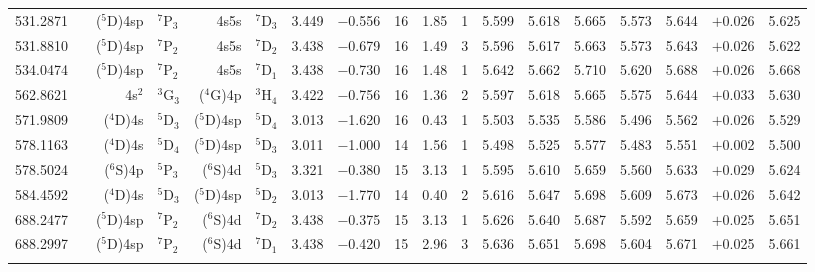 \documentclass[traditabstract]{aa}
\newcommand{\pst}{\phantom{*}}
\begin{document}
\begin{center}
\begin{mpsupertabular}{r@{}c@{\ \ \ }r@{~}l@{\ }r@{~}l@{\ \ \ }c@{\ \ \ }c@{\ \ \ }c@{\ \ \ }c@{\ \ \ }c@{\ \ \ }c@{\ \ \ }c@{\ \ \ }c@{\ \ \ }c@{\ \ \ }c@{\ \ \ }r@{\ \ \ }c}
531.2871 & & \footnotesize ($^5$D)4sp&\footnotesize$^7$P$_3$             &\footnotesize     4s5s  &\footnotesize$^7$D$_3$             & 3.449 & $-$0.556 &16  & 1.85 & 1\pst      & 5.599 & 5.618 & 5.665 & 5.573 & 5.644 & $+$0.026    & 5.625 \\
531.8810 & & \footnotesize ($^5$D)4sp&\footnotesize$^7$P$_2$             &\footnotesize     4s5s  &\footnotesize$^7$D$_2$             & 3.438 & $-$0.679 &16  & 1.49 & 3\pst      & 5.596 & 5.617 & 5.663 & 5.573 & 5.643 & $+$0.026    & 5.622 \\
534.0474 & & \footnotesize ($^5$D)4sp&\footnotesize$^7$P$_2$             &\footnotesize     4s5s  &\footnotesize$^7$D$_1$             & 3.438 & $-$0.730 &16  & 1.48 & 1\pst      & 5.642 & 5.662 & 5.710 & 5.620 & 5.688 & $+$0.026    & 5.668 \\
562.8621 & & \footnotesize 4s$^2$    &\footnotesize$^3$G$_3$             &\footnotesize($^4$G)4p  &\footnotesize$^3$H$_4$             & 3.422 & $-$0.756 &16  & 1.36 & 2\pst      & 5.597 & 5.618 & 5.665 & 5.575 & 5.644 & $+$0.033    & 5.630 \\
571.9809 & & \footnotesize ($^4$D)4s &\footnotesize$^5$D$_3$             &\footnotesize($^5$D)4sp &\footnotesize$^5$D$_4$             & 3.013 & $-$1.620 &16  & 0.43 & 1\pst      & 5.503 & 5.535 & 5.586 & 5.496 & 5.562 & $+$0.026    & 5.529 \\
578.1163 & & \footnotesize ($^4$D)4s &\footnotesize$^5$D$_4$             &\footnotesize($^5$D)4sp &\footnotesize$^5$D$_3$             & 3.011 & $-$1.000 &14  & 1.56 & 1\pst      & 5.498 & 5.525 & 5.577 & 5.483 & 5.551 & $+$0.002    & 5.500 \\
578.5024 & & \footnotesize ($^6$S)4p &\footnotesize$^5$P$_3$             &\footnotesize($^6$S)4d  &\footnotesize$^5$D$_3$             & 3.321 & $-$0.380 &15  & 3.13 & 1\pst      & 5.595 & 5.610 & 5.659 & 5.560 & 5.633 & $+$0.029    & 5.624 \\
584.4592 & & \footnotesize ($^4$D)4s &\footnotesize$^5$D$_3$             &\footnotesize($^5$D)4sp &\footnotesize$^5$D$_2$             & 3.013 & $-$1.770 &14  & 0.40 & 2\pst      & 5.616 & 5.647 & 5.698 & 5.609 & 5.673 & $+$0.026    & 5.642 \\
688.2477 & & \footnotesize ($^5$D)4sp&\footnotesize$^7$P$_2$             &\footnotesize($^6$S)4d  &\footnotesize$^7$D$_2$             & 3.438 & $-$0.375 &15  & 3.13 & 1\pst      & 5.626 & 5.640 & 5.687 & 5.592 & 5.659 & $+$0.025    & 5.651 \\
688.2997 & & \footnotesize ($^5$D)4sp&\footnotesize$^7$P$_2$             &\footnotesize($^6$S)4d  &\footnotesize$^7$D$_1$             & 3.438 & $-$0.420 &15  & 2.96 & 3\pst      & 5.636 & 5.651 & 5.698 & 5.604 & 5.671 & $+$0.025    & 5.661 \\
   & & & & & & & & & & & & & & & \\


\end{mpsupertabular}
\end{center}
\end{document}

